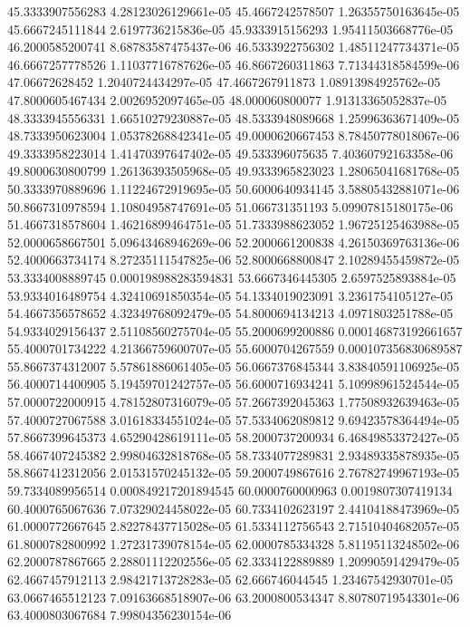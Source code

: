{45.3333907556283 4.28123026129661e-05
45.4667242578507 1.26355750163645e-05
45.6667245111844 2.6197736215836e-05
45.9333915156293 1.95411503668776e-05
46.2000585200741 8.68783587475437e-06
46.5333922756302 1.48511247734371e-05
46.6667257778526 1.11037716787626e-05
46.8667260311863 7.71344318584599e-06
47.06672628452 1.2040724434297e-05
47.4667267911873 1.08913984925762e-05
47.8000605467434 2.0026952097465e-05
48.000060800077 1.91313365052837e-05
48.3333945556331 1.66510279230887e-05
48.5333948089668 1.25996363671409e-05
48.7333950623004 1.05378268842341e-05
49.0000620667453 8.78450778018067e-06
49.3333958223014 1.41470397647402e-05
49.533396075635 7.40360792163358e-06
49.8000630800799 1.26136393505968e-05
49.9333965823023 1.28065041681768e-05
50.3333970889696 1.11224672919695e-05
50.6000640934145 3.58805432881071e-06
50.8667310978594 1.10804958747691e-05
51.066731351193 5.09907815180175e-06
51.4667318578604 1.46216899464751e-05
51.7333988623052 1.96725125463988e-05
52.0000658667501 5.09643468946269e-06
52.2000661200838 4.26150369763136e-06
52.4000663734174 8.27235111547825e-06
52.8000668800847 2.10289455459872e-05
53.3334008889745 0.000198988283594831
53.6667346445305 2.6597525893884e-05
53.9334016489754 4.32410691850354e-05
54.1334019023091 3.2361754105127e-05
54.4667356578652 4.32349768092479e-05
54.8000694134213 4.0971803251788e-05
54.9334029156437 2.51108560275704e-05
55.2000699200886 0.000146873192661657
55.4000701734222 4.21366759600707e-05
55.6000704267559 0.000107356830689587
55.8667374312007 5.57861886061405e-05
56.0667376845344 3.83840591106925e-05
56.4000714400905 5.19459701242757e-05
56.6000716934241 5.10998961524544e-05
57.0000722000915 4.78152807316079e-05
57.2667392045363 1.77508932639463e-05
57.4000727067588 3.01618334551024e-05
57.5334062089812 9.69423578364494e-05
57.8667399645373 4.65290428619111e-05
58.2000737200934 6.46849853372427e-05
58.4667407245382 2.99804632818768e-05
58.7334077289831 2.93489335878935e-05
58.8667412312056 2.01531570245132e-05
59.2000749867616 2.76782749967193e-05
59.7334089956514 0.000849217201894545
60.0000760000963 0.0019807307419134
60.4000765067636 7.07329024458022e-05
60.7334102623197 2.44104188473969e-05
61.0000772667645 2.82278437715028e-05
61.5334112756543 2.71510404682057e-05
61.8000782800992 1.27231739078154e-05
62.0000785334328 5.81195113248502e-06
62.2000787867665 2.28801112202556e-05
62.3334122889889 1.20990591429479e-05
62.4667457912113 2.98421713728283e-05
62.666746044545 1.23467542930701e-05
63.0667465512123 7.09163668518907e-06
63.2000800534347 8.80780719543301e-06
63.4000803067684 7.99804356230154e-06
}
